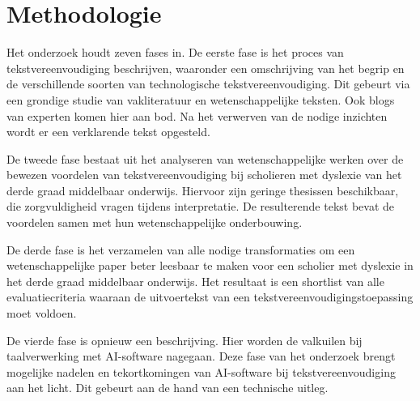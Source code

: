 
\section{Methodologie}%
\label{sec:methodologie}

Het onderzoek houdt zeven fases in. De eerste fase is het proces van tekstvereenvoudiging beschrijven, waaronder een omschrijving van het begrip en de verschillende soorten van technologische tekstvereenvoudiging. Dit gebeurt via een grondige studie van vakliteratuur en wetenschappelijke teksten. Ook blogs van experten komen hier aan bod. Na het verwerven van de nodige inzichten wordt er een verklarende tekst opgesteld.

De tweede fase bestaat uit het analyseren van wetenschappelijke werken over de bewezen voordelen van tekstvereenvoudiging bij scholieren met dyslexie van het derde graad middelbaar onderwijs. Hiervoor zijn geringe thesissen beschikbaar, die zorgvuldigheid vragen tijdens interpretatie. De resulterende tekst bevat de voordelen samen met hun wetenschappelijke onderbouwing.

De derde fase is het verzamelen van alle nodige transformaties om een wetenschappelijke paper beter leesbaar te maken voor een scholier met dyslexie in het derde graad middelbaar onderwijs. Het resultaat is een shortlist van alle evaluatiecriteria waaraan de uitvoertekst van een tekstvereenvoudigingstoepassing moet voldoen.

De vierde fase is opnieuw een beschrijving. Hier worden de valkuilen bij taalverwerking met AI-software nagegaan. Deze fase van het onderzoek brengt mogelijke nadelen en tekortkomingen van AI-software bij tekstvereenvoudiging aan het licht. Dit gebeurt aan de hand van een technische uitleg.

